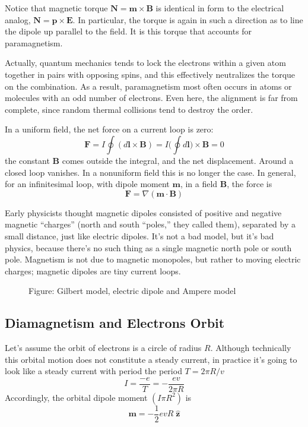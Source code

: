 \documentclass[../../../main.tex]{subfiles}
\begin{document}
Notice that magnetic torque $ \mathbf{N}=\mathbf{m}\times\mathbf{B}$ is identical in form to the electrical analog, $\mathbf{N} = \mathbf{p} \times \mathbf{E}$. In particular, the torque is again in such a direction as to line the dipole up parallel to the ﬁeld. It is this torque that accounts for paramagnetism.

Actually, quantum mechanics tends to lock the electrons within a given atom together in pairs with opposing spins, and this effectively neutralizes the torque on the combination. As a result, paramagnetism most often occurs in atoms or molecules with an odd number of electrons. Even here, the alignment is far from complete, since random thermal collisions tend to destroy the order.

In a uniform ﬁeld, the net force on a current loop is zero:
\begin{equation*}
    \mathbf{F}=I\oint (d\mathbf{l}\times \mathbf{B})=I\biggl(\oint d\mathbf{l}\biggr)\times \mathbf{B}=0
\end{equation*}
the constant \textbf{B} comes outside the integral, and the net displacement. Around a closed loop vanishes. In a nonuniform ﬁeld this is no longer the case. In general, for an inﬁnitesimal loop, with dipole moment $\mathbf{m}$, in a ﬁeld \textbf{B}, the force is
\begin{equation*}
    \mathbf{F}=\nabla(\mathbf{m}\cdot\mathbf{B})
\end{equation*}

Early physicists thought magnetic dipoles consisted of positive and negative magnetic “charges” (north and south “poles,” they called them), separated by a small distance, just like electric dipoles. It’s not a bad model, but it’s bad physics, because there’s no such thing as a single magnetic north pole or south pole. Magnetism is not due to magnetic monopoles, but rather to moving electric charges; magnetic dipoles are tiny current loops.
\begin{figure*}
    \centering
    \caption*{Figure: Gilbert model, electric dipole and Ampere model}
\end{figure*}

\subsection{Diamagnetism and Electrons Orbit}
Let’s assume the  orbit of electrons is a circle of radius $R$. Although technically this orbital motion does not constitute a steady current, in practice it's going to look like a steady current with period the period $T = 2\pi R/v$
\begin{equation*}
    I=\frac{-e}{T}=-\frac{ev}{2\pi R}
\end{equation*}
Accordingly, the orbital dipole moment $(I \pi R^2)$ is
\begin{equation*}
    \mathbf{m}=-\frac{1}{2}evR \;\mathbf{\hat{z}}
\end{equation*}
\end{document}
